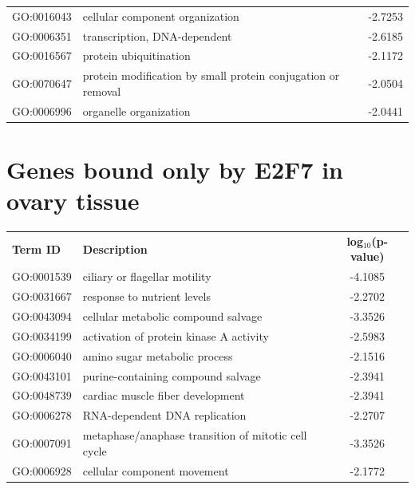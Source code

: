 \documentclass[11pt,twoside,a4paper]{report}
\begin{document}
\begin{appendices}
\begin{longtable}{@{\extracolsep{\fill}}llc@{}}
    GO:0016043 & cellular component organization                                        & -2.7253       \\
    GO:0006351 & transcription, DNA-dependent                                           & -2.6185       \\
    GO:0016567 & protein ubiquitination                                                 & -2.1172       \\
    GO:0070647 & protein modification by small protein conjugation or removal           & -2.0504       \\
    GO:0006996 & organelle organization                                                 & -2.0441       \\
    \end{longtable}
	
	\section{Genes bound only by E2F7 in ovary tissue}
	\footnotesize  %
	\begin{longtable}{@{\extracolsep{\fill}}llc@{}}
	\textbf{Term ID}  & \textbf{Description}                         & \textbf{log$_{10}$(p-value)} \\
	GO:0001539 & ciliary or flagellar motility                       & -4.1085       \\
    GO:0031667 & response to nutrient levels                         & -2.2702       \\
    GO:0043094 & cellular metabolic compound salvage                 & -3.3526       \\
    GO:0034199 & activation of protein kinase A activity             & -2.5983       \\
    GO:0006040 & amino sugar metabolic process                       & -2.1516       \\
    GO:0043101 & purine-containing compound salvage                  & -2.3941       \\
    GO:0048739 & cardiac muscle fiber development                    & -2.3941       \\
    GO:0006278 & RNA-dependent DNA replication                       & -2.2707       \\
    GO:0007091 & metaphase/anaphase transition of mitotic cell cycle & -3.3526       \\
    GO:0006928 & cellular component movement                         & -2.1772       \\

\end{longtable}
\end{appendices}
\end{document}
